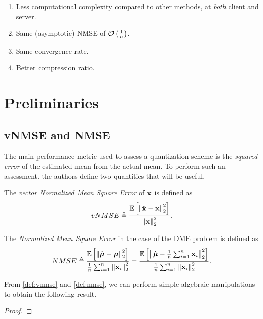 \documentclass[journal,12pt,twocolumn]{IEEEtran}
\begin{document}
\begin{enumerate}
    \item Less computational complexity compared to other methods, at 
    \emph{both} client and server.
    \item Same (asymptotic) NMSE of \(\mathcal O\left(\frac{1}{n}\right)\).
    \item Same convergence rate.
    \item Better compression ratio.
\end{enumerate}

\section{Preliminaries}
\label{sec:prelims}
    \subsection{vNMSE and NMSE}
    \label{ssec:nmse}
    The main performance metric used to assess a quantization scheme is the
    \emph{squared error} of the estimated mean from the actual mean. To perform
    such an assessment, the authors define two quantities that will be useful.
    \begin{definition}[vNMSE]
        \label{def:vnmse}
        The \emph{vector Normalized Mean Square Error} of \(\boldsymbol{\mathbf{x}}\)
        is defined as
        \begin{equation}
            vNMSE \triangleq \frac{\mathbb{E}\left[ \left\lVert\hat{\boldsymbol{\mathbf{x}}}-\boldsymbol{\mathbf{x}}\right\rVert^2_2 \right]}{\left\lVert\boldsymbol{\mathbf{x}}\right\rVert^2_2}.
            \label{eq:vnmse-def}
        \end{equation}
    \end{definition}
    \begin{definition}[NMSE]
        \label{def:nmse}
        The \emph{Normalized Mean Square Error} in the case of the DME
        problem is defined as
        \begin{equation}
            NMSE \triangleq \frac{\mathbb{E}\left[ \left\lVert\hat{\boldsymbol{\mathbf{\mu}}}-\boldsymbol{\mathbf{\mu}}\right\rVert^2_2 \right]}{\frac{1}{n}\sum_{i=1}^n\left\lVert\boldsymbol{\mathbf{x}}_i\right\rVert^2_2} = \frac{\mathbb{E}\left[ \left\lVert\hat{\boldsymbol{\mathbf{\mu}}}-\frac{1}{n}\sum_{i=1}^n\boldsymbol{\mathbf{x}}_i\right\rVert^2_2 \right]}{\frac{1}{n}\sum_{i=1}^n\left\lVert\boldsymbol{\mathbf{x}}_i\right\rVert^2_2}.
            \label{eq:nmse-def}
        \end{equation}
    \end{definition}
    From \autoref{def:vnmse} and \autoref{def:nmse}, we can perform simple 
    algebraic manipulations to obtain the following result.
    \begin{lemma}
    \end{lemma}
    \begin{proof}
    \end{proof}
\end{document}
